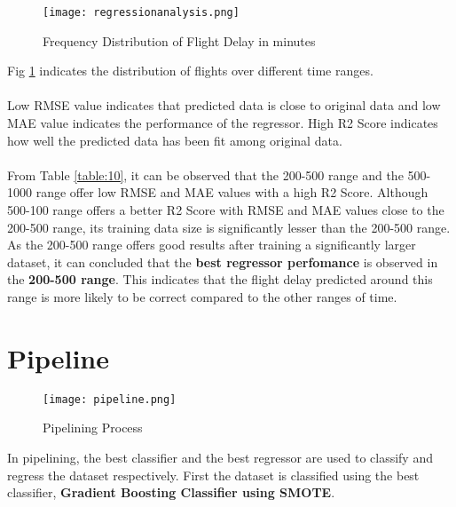 \documentclass[12pt,letter-paper]{article}
\begin{document}
    \begin{figure}[H]%
        \begin{center}
            \texttt{[image: regressionanalysis.png]}%
                \caption{Frequency Distribution of Flight Delay in minutes}  \label{fig:4}
        \end{center}
    \end{figure}
    
    Fig \ref{fig:4} indicates the distribution of flights over different time ranges. 
    
    \paragraph{}
    Low RMSE value indicates that predicted data is close to original data and low MAE value indicates the performance of the regressor. High R2 Score indicates how well the predicted data has been fit among original data.
    
    \paragraph{}
    From Table \ref{table:10}, it can be observed that the 200-500 range and the 500-1000 range offer low RMSE and MAE values with a high R2 Score. Although 500-100 range offers a better R2 Score with RMSE and MAE values close to the 200-500 range, its training data size is significantly lesser than the 200-500 range. As the 200-500 range offers good results after training a significantly larger dataset, it can concluded that the {\bfseries best regressor perfomance} is observed in the {\bfseries 200-500 range}. This indicates that the flight delay predicted around this range is more likely to be correct compared to the other ranges of time.
    
\section{Pipeline}

    \begin{figure}[H]%
        \begin{center}
            \texttt{[image: pipeline.png]}%
                \caption{Pipelining Process}
                \label{fig:5}
        \end{center}
    \end{figure}
    
    In pipelining, the best classifier and the best regressor are used to classify and regress the dataset respectively. First the dataset is classified using the best classifier, {\bfseries Gradient Boosting Classifier using SMOTE}. 
    
\end{document}
